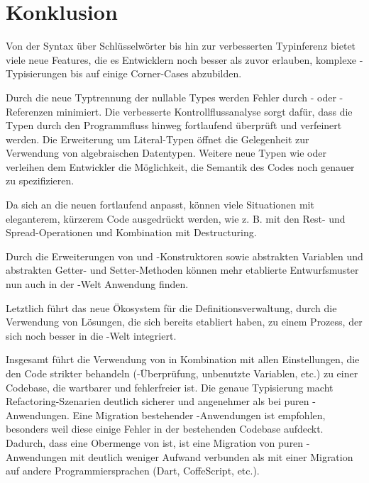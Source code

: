 \section{Konklusion}
Von der Syntax über Schlüsselwörter bis hin zur verbesserten Typinferenz bietet  viele neue Features, die es Entwicklern noch besser als zuvor erlauben, komplexe \js-Typisierungen bis auf einige Corner-Cases abzubilden.

Durch die neue Typtrennung der nullable Types werden Fehler durch \tsnull- oder \tsundefined-Re\-fe\-ren\-zen minimiert. Die verbesserte Kontrollflussanalyse sorgt dafür, dass die Typen durch den Programmfluss hinweg fortlaufend überprüft und verfeinert werden. Die Erweiterung um Literal-Typen öffnet die Gelegenheit zur Verwendung von algebraischen Datentypen. Weitere neue Typen wie \tsnever oder \tsobject verleihen dem Entwickler die Möglichkeit, die Semantik des Codes noch genauer zu spezifizieren.

Da sich \ts an die neuen \esss fortlaufend anpasst, können viele Situationen mit eleganterem, kürzerem Code ausgedrückt werden, wie z. B. mit den Rest- und Spread-Operationen und Kombination mit Destructuring.

Durch die Erweiterungen von \tsprivate und \tsprotected-Kon\-struk\-to\-ren sowie abstrakten Variablen und abstrakten Get\-ter- und Set\-ter-Methoden können mehr etablierte Entwurfsmuster nun auch in der \ts-Welt Anwendung finden.

Letztlich führt das neue Ökosystem für die Definitionsverwaltung, durch die Verwendung von Lösungen, die sich bereits etabliert haben, zu einem Prozess, der sich noch besser in die \js-Welt integriert.

Insgesamt führt die Verwendung von \ts in Kombination mit allen Einstellungen, die den Code strikter behandeln (\tsnull-Überprüfung, unbenutzte Variablen, etc.) zu einer Codebase, die wartbarer und fehlerfreier ist. Die genaue Typisierung macht Refactoring-Szenarien deutlich sicherer und angenehmer als bei puren \js-Anwendungen. Eine Migration bestehender -An\-wen\-dun\-gen ist empfohlen, besonders weil diese einige Fehler in der bestehenden Codebase aufdeckt. Dadurch, dass \ts eine Obermenge von \js ist, ist eine Migration von puren \js-Anwendungen mit deutlich weniger Aufwand verbunden als mit einer Migration auf andere Programmiersprachen (Dart, CoffeScript, etc.).

\clearpage

\nocite{*}



\balancecolumns

